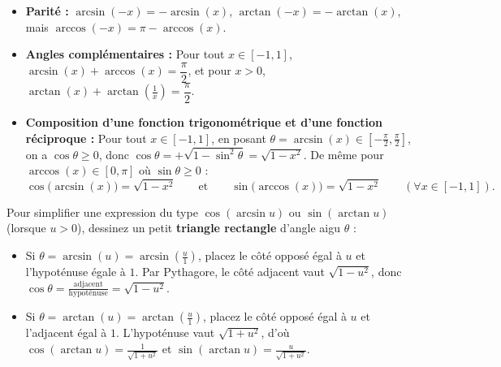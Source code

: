 \begin{theoreme}
\begin{itemize}
    \item \textbf{Parité :} $\arcsin(-x) = -\arcsin(x)$, $\arctan(-x) = -\arctan(x)$, mais $\arccos(-x) = \pi - \arccos(x)$.
    \item \textbf{Angles complémentaires :} Pour tout $x \in [-1, 1]$, $\arcsin(x) + \arccos(x) = \dfrac{\pi}{2}$, et pour $x > 0$, $\arctan(x) + \arctan\left(\frac{1}{x}\right) = \dfrac{\pi}{2}$.
    \item \textbf{Composition d'une fonction trigonométrique et d'une fonction réciproque :} Pour tout $x \in [-1, 1]$, en posant $\theta = \arcsin(x) \in \left[-\frac{\pi}{2}, \frac{\pi}{2}\right]$, on a $\cos\theta \ge 0$, donc $\cos\theta = +\sqrt{1-\sin^2\theta} = \sqrt{1-x^2}$. De même pour $\arccos(x) \in [0, \pi]$ où $\sin\theta \ge 0$ :
    \[
        \boxed{\cos\bigl(\arcsin(x)\bigr) = \sqrt{1 - x^2}} \qquad \text{et} \qquad \boxed{\sin\bigl(\arccos(x)\bigr) = \sqrt{1 - x^2}} \qquad (\forall x \in [-1, 1]).
    \]
\end{itemize}
\end{theoreme}

\begin{astuce}
Pour simplifier une expression du type $\cos(\arcsin u)$ ou $\sin(\arctan u)$ (lorsque $u > 0$), dessinez un petit \textbf{triangle rectangle} d'angle aigu $\theta$ :
\begin{itemize}
    \item Si $\theta = \arcsin(u) = \arcsin\left(\frac{u}{1}\right)$, placez le côté opposé égal à $u$ et l'hypoténuse égale à $1$. Par Pythagore, le côté adjacent vaut $\sqrt{1-u^2}$, donc $\cos\theta = \frac{\text{adjacent}}{\text{hypoténuse}} = \sqrt{1-u^2}$.
    \item Si $\theta = \arctan(u) = \arctan\left(\frac{u}{1}\right)$, placez le côté opposé égal à $u$ et l'adjacent égal à $1$. L'hypoténuse vaut $\sqrt{1+u^2}$, d'où $\cos(\arctan u) = \frac{1}{\sqrt{1+u^2}}$ et $\sin(\arctan u) = \frac{u}{\sqrt{1+u^2}}$.
\end{itemize}
\end{astuce}

